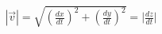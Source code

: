 \documentclass[preview]{standalone}
\begin{document}
\begin{align*}
|\vec{v}| = \sqrt{ \left( \frac{dx}{dt} \right)^2 + \left(\frac{dy}{dt}\right)^2} = \Big|\frac{dz}{dt}\Big|
\end{align*}
\end{document}
